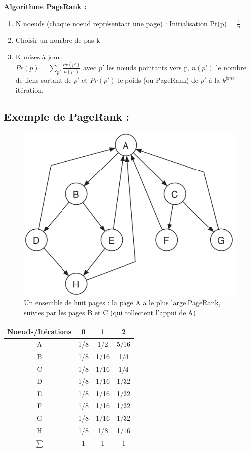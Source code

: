 \textbf{ Algorithme PageRank :}
\begin{enumerate}
	\item N noeuds (chaque noeud représentant une page) :
	Initialisation Pr(p) =  $\frac{1}{n}$
	\item Choisir un nombre de pas k
	\item K mises à jour:\\
	$Pr(p) =  \sum_ {p'}\frac{Pr(p')}{n(p')} $ avec $p'$ les nœuds pointants vers p, $n(p')$ le nombre de liens sortant de $p'$ et $Pr(p')$ le poids (ou PageRank) de $p'$ à la $k^{ème}$ itération.
\end{enumerate}
\subsection*{Exemple de PageRank :}

\begin{figure}[!ht]
\centering
 \includegraphics[width=0.5\linewidth]{images/24_PageRank.png}
 \caption{Un ensemble de huit pages : la page A a le plus large
     PageRank, suivies par les pages B et C (qui collectent l'appui de
 A)}
 \label{graphPageRank}
\end{figure}

 
 	\begin{tabular}{|c| c |c |c |}
		\hline
		Noeuds/Itérations & 0 & 1 & 2 \\
		\hline
		A & 1/8 & 1/2 & 5/16 \\
		B & 1/8 & 1/16 &  1/4   \\
		C & 1/8 & 1/16 & 1/4    \\
		D & 1/8 & 1/16 & 1/32  \\
		E & 1/8 & 1/16 &  1/32   \\
		F & 1/8 & 1/16 & 1/32    \\
		G & 1/8 & 1/16 & 1/32    \\
		H & 1/8 & 1/8 &  1/16   \\
		\hline
		$\sum $ & 1 & 1 & 1 \\
		\hline
	\end{tabular}


